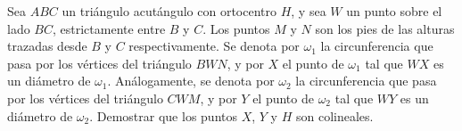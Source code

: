 Sea $ABC$ un triángulo acutángulo con ortocentro $H$, y sea $W$ un punto sobre el lado $BC$, estrictamente entre $B$ y $C$. Los puntos $M$ y $N$ son los pies de las alturas trazadas desde $B$ y $C$ respectivamente. Se denota por $\omega_1$ la circunferencia que pasa por los vértices del triángulo $BWN$, y por $X$ el punto de $\omega_1$ tal que $WX$ es un diámetro de $\omega_1$. Análogamente, se denota por $\omega_2$ la circunferencia que pasa por los vértices del triángulo $CWM$, y por $Y$ el punto de $\omega_2$ tal que $WY$ es un diámetro de $\omega_2$. Demostrar que los puntos $X$, $Y$ y $H$ son colineales.